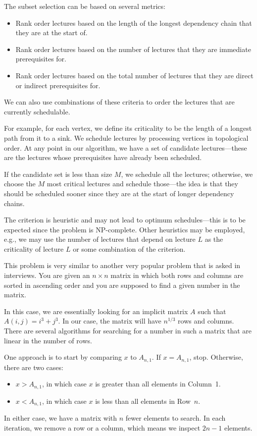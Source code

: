 The subset selection can be based on several metrics:
\begin{itemize}
\itemsep 1pt
\item Rank order lectures based on the length of the longest 
dependency chain that they are at the start of.
\item Rank order lectures based on the number of lectures
that they are immediate prerequisites for.
\item Rank order lectures based on the total number of lectures
that they are direct or indirect prerequisites for.
\end{itemize} 
We can also use combinations of these criteria to order the lectures
that are currently schedulable.

For example, for each vertex, we define its criticality to be the length of a longest path
from it to a sink.  We schedule lectures by processing vertices
in topological order.  At any point in our algorithm, we have a set of candidate
lectures---these are the lectures whose prerequisites have already been scheduled.

If the candidate set is less than size $M$, we schedule all the lectures; otherwise, we choose the $M$ most critical lectures and schedule those---the
idea is that they should be scheduled sooner since they are at the start of
longer dependency chains.

The criterion is heuristic and may not lead 
to optimum schedules---this is to be expected since the problem is NP-complete.
Other heuristics may be employed, e.g., we may use the number of lectures that depend
on lecture $L$ as the criticality of lecture $L$ or some combination of the criterion.

This problem is very similar to another very popular problem that 
is asked in interviews. You 
are given an $n \times n$ matrix in which both rows and columns are sorted in ascending order and you are supposed to find a given
number in the matrix. 

In this case, we are essentially looking for an
implicit matrix $A$ such that $A(i,j) = i^3 + j^3$.  In our case, the
matrix will have $n^{1/3}$ rows and columns. There are several
algorithms for searching  for a number in such a matrix that are linear
in the number of rows. 

One approach is to start by comparing $x$ to $A_{n,1}$. If $x = A_{n,1}$,
stop. Otherwise, there are two cases:
\begin{itemize}
\itemsep 1pt
\item $x > A_{n,1}$, in which case $x$  is greater than all elements in Column~1.
\item $x < A_{n,1}$, in which case $x $ is less than all elements in Row~$n$.
\end{itemize} 
In either case, we have a matrix with $n$ fewer elements to search.
In each iteration, we remove a row or a column, which means we inspect $2n-1$ elements.

